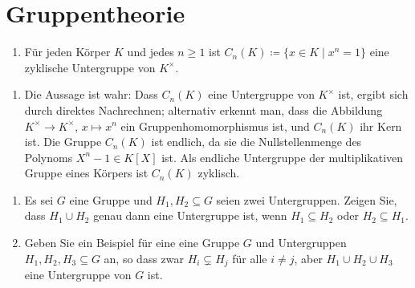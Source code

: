 \section{Gruppentheorie}


\begin{question}[subtitle = Multiple Choice]
  \begin{enumerate}
    \item
      Für jeden Körper $K$ und jedes $n \geq 1$ ist $C_n(K) \coloneqq \{x \in K \mid x^n = 1\}$ eine zyklische Untergruppe von $K^\times$.
  \end{enumerate}
\end{question}


\begin{solution}
  \begin{enumerate}
    \item
      Die Aussage ist wahr:
      Dass $C_n(K)$ eine Untergruppe von $K^\times$ ist, ergibt sich durch direktes Nachrechnen;
      alternativ erkennt man, dass die Abbildung $K^\times \to K^\times$, $x \mapsto x^n$ ein Gruppenhomomorphismus ist, und $C_n(K)$ ihr Kern ist.
      Die Gruppe $C_n(K)$ ist endlich, da sie die Nullstellenmenge des Polynoms $X^n - 1 \in K[X]$ ist.
      Als endliche Untergruppe der multiplikativen Gruppe eines Körpers ist $C_n(K)$ zyklisch.
  \end{enumerate}
\end{solution}


\begin{question}
  \begin{enumerate}
    \item
      Es sei $G$ eine Gruppe und $H_1, H_2 \subseteq G$ seien zwei Untergruppen.
      Zeigen Sie, dass $H_1 \cup H_2$ genau dann eine Untergruppe ist, wenn $H_1 \subseteq H_2$ oder $H_2 \subseteq H_1$.
    \item
      Geben Sie ein Beispiel für eine eine Gruppe $G$ und Untergruppen $H_1, H_2, H_3 \subseteq G$ an, so dass zwar $H_i \subsetneq H_j$ für alle $i \neq j$, aber $H_1 \cup H_2 \cup H_3$ eine Untergruppe von $G$ ist.
  \end{enumerate}
\end{question}


